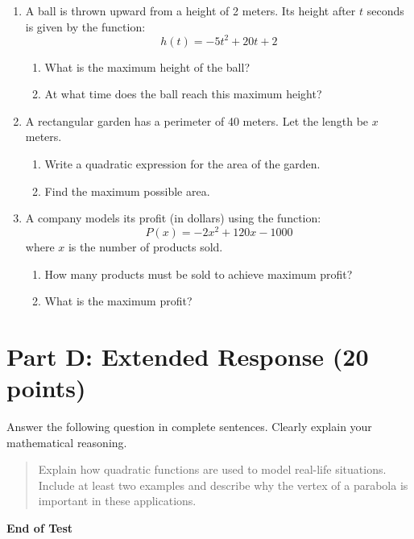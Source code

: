 \documentclass[12pt]{article}
\begin{document}
\begin{enumerate}[label=\arabic*.]
    \item A ball is thrown upward from a height of 2 meters. Its height after $t$ seconds is given by the function:
    \[
    h(t) = -5t^2 + 20t + 2
    \]
    \begin{enumerate}[label=(\alph*)]
        \item What is the maximum height of the ball?
        \item At what time does the ball reach this maximum height?
    \end{enumerate}

    \vspace{4cm}

    \item A rectangular garden has a perimeter of 40 meters. Let the length be $x$ meters.
    \begin{enumerate}[label=(\alph*)]
        \item Write a quadratic expression for the area of the garden.
        \item Find the maximum possible area.
    \end{enumerate}

    \vspace{4cm}

    \item A company models its profit (in dollars) using the function:
    \[
    P(x) = -2x^2 + 120x - 1000
    \]
    where $x$ is the number of products sold.
    \begin{enumerate}[label=(\alph*)]
        \item How many products must be sold to achieve maximum profit?
        \item What is the maximum profit?
    \end{enumerate}

    \vspace{4cm}
\end{enumerate}

\section*{Part D: Extended Response (20 points)}

Answer the following question in complete sentences. Clearly explain your mathematical reasoning.

\begin{quote}
Explain how quadratic functions are used to model real-life situations. Include at least two examples and describe why the vertex of a parabola is important in these applications.
\end{quote}

\vspace{6cm}

\begin{center}
    \textbf{End of Test}
\end{center}
\end{document}
